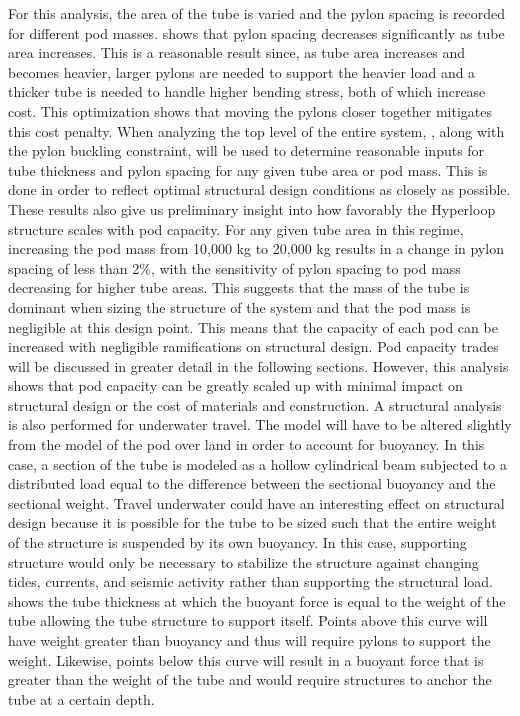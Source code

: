 For this analysis, the area of the tube is varied and the pylon spacing is
recorded for different pod masses. 
shows that pylon spacing decreases significantly as tube area increases.
This is a reasonable result since, as tube area increases and becomes heavier, larger
pylons are needed to support the heavier load and a thicker tube is needed to
handle higher bending stress, both of which increase cost. This optimization
shows that moving the pylons closer together mitigates this cost penalty.
When analyzing the top level of the entire system, ,
along with the pylon buckling constraint, will be used to determine reasonable
inputs for tube thickness and pylon spacing for any given tube area or pod mass.
This is done in order to reflect optimal structural design conditions as closely as possible.
These results also give us preliminary insight into how favorably the Hyperloop
structure scales with pod capacity. For any given tube area in this regime,
increasing the pod mass from 10,000 kg to 20,000 kg results in a change in
pylon spacing of less than 2\%, with the sensitivity of pylon spacing to pod
mass decreasing for higher tube areas. This suggests that the mass of the tube
is dominant when sizing the structure of the system and that the pod mass is
negligible at this design point. This means that the capacity of each pod can be
increased with negligible ramifications on structural design. Pod capacity
trades will be discussed in greater detail in the following sections. However,
this analysis shows that pod capacity can be greatly scaled up with minimal
impact on structural design or the cost of materials and construction.
A structural analysis is also performed for underwater travel.
The model will have to be altered slightly from the model of the pod over land
in order to account for buoyancy. In this case, a section of the tube is
modeled as a hollow cylindrical beam subjected to a distributed load equal to
the difference between the sectional buoyancy and the sectional weight.
Travel underwater could have an interesting effect on structural design because
it is possible for the tube to be sized such that the entire weight of the
structure is suspended by its own buoyancy. In this case, supporting structure
would only be necessary to stabilize the structure against changing tides,
currents, and seismic activity rather than supporting the structural load.
 shows the tube thickness at which the buoyant
force is equal to the weight of the tube allowing the tube structure to support itself.
Points above this curve will have weight greater than buoyancy and thus will
require pylons to support the weight. Likewise, points below this curve will
result in a buoyant force that is greater than the weight of the tube and would
require structures to anchor the tube at a certain depth.

